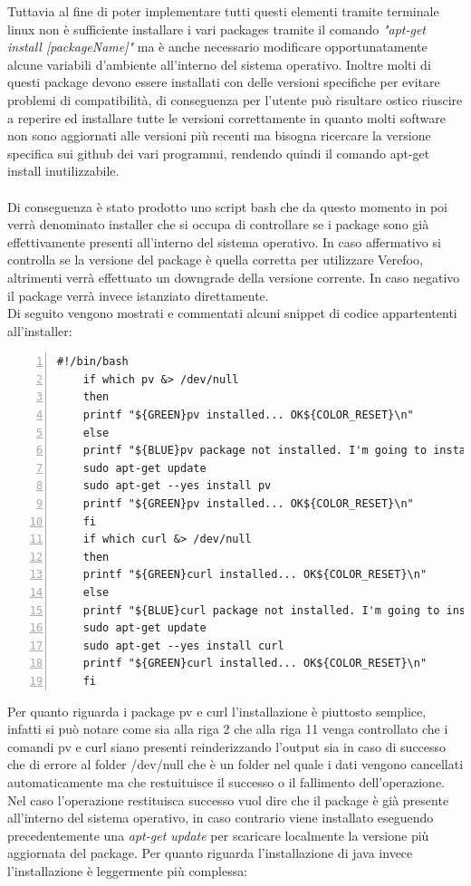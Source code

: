 Tuttavia al fine di poter implementare tutti questi elementi tramite terminale linux non è sufficiente installare i vari packages tramite il comando
\textit{"apt-get install [packageName]"} ma è anche necessario modificare opportunatamente alcune variabili d'ambiente all'interno del sistema operativo. Inoltre molti di questi package devono essere installati con delle versioni specifiche per evitare problemi di compatibilità,
di conseguenza per l'utente può risultare ostico riuscire a reperire ed installare tutte le versioni correttamente in quanto molti software non sono aggiornati alle versioni più recenti ma bisogna ricercare la versione specifica sui github dei vari programmi, rendendo quindi il comando apt-get install inutilizzabile.
\\ \\
Di conseguenza è stato prodotto uno script bash che da questo momento in poi verrà denominato installer che si occupa di controllare se i package sono già effettivamente presenti all'interno del sistema operativo. In caso affermativo si controlla se la versione del package è quella corretta per utilizzare Verefoo, altrimenti verrà
effettuato un downgrade della versione corrente. In caso negativo il package verrà invece istanziato direttamente.
\\Di seguito vengono mostrati e commentati alcuni snippet di codice appartententi all'installer:

\begin{lstlisting}[style=bashstyle, caption={Installazione packages curl e pv}, label=lst:bash-example,numbers=left]
    #!/bin/bash
    if which pv &> /dev/null
    then
    printf "${GREEN}pv installed... OK${COLOR_RESET}\n"
    else
    printf "${BLUE}pv package not installed. I'm going to install it\n${COLOR_RESET}\n"
    sudo apt-get update
    sudo apt-get --yes install pv
    printf "${GREEN}pv installed... OK${COLOR_RESET}\n"
    fi
    if which curl &> /dev/null
    then
    printf "${GREEN}curl installed... OK${COLOR_RESET}\n"
    else
    printf "${BLUE}curl package not installed. I'm going to install it\n${COLOR_RESET}\n"
    sudo apt-get update
    sudo apt-get --yes install curl
    printf "${GREEN}curl installed... OK${COLOR_RESET}\n"
    fi
\end{lstlisting}

Per quanto riguarda i package pv e curl l'installazione è piuttosto semplice, infatti si può notare come sia alla riga 2 che alla riga 11 venga controllato che i comandi pv e curl siano presenti reinderizzando l'output sia in caso di successo che di errore al folder /dev/null che è un folder nel quale i 
dati vengono cancellati automaticamente ma che restuituisce il successo o il fallimento dell'operazione. Nel caso l'operazione restituisca successo vuol dire che il package è già presente all'interno del sistema operativo, in caso contrario viene installato eseguendo precedentemente una \textit{apt-get update}
per scaricare localmente la versione più aggiornata del package.
Per quanto riguarda l'installazione di java invece l'installazione è leggermente più complessa:


